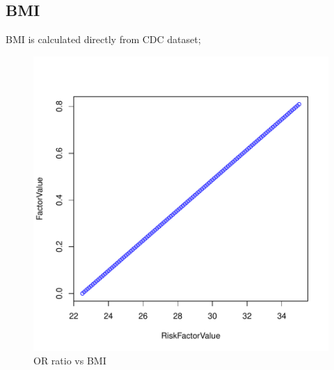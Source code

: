 \documentclass{report}
\begin{document}
\newpage
\subsection{\color{green}BMI}
BMI is calculated directly from CDC dataset;
\begin{center}
\begin{figure}[H]
\includegraphics{EPFL-BMI}
\caption{OR ratio vs BMI}
\end{figure}
\end{center}

\newpage
\end{document}
